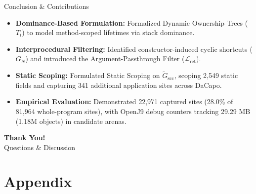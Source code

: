 \documentclass[11pt]{beamer}
\begin{document}
\begin{frame}{Conclusion \& Contributions}
  \begin{itemize}
    \item \textbf{Dominance-Based Formulation:} Formalized Dynamic Ownership Trees ($T_t$) to model method-scoped lifetimes via stack dominance.
    \item \textbf{Interprocedural Filtering:} Identified constructor-induced cyclic shortcuts ($G_N$) and introduced the Argument-Passthrough Filter ($\mathcal{L}_{\text{ret}}$).
    \item \textbf{Static Scoping:} Formulated Static Scoping on $\widetilde{G}_{\text{scc}}$, scoping 2,549 static fields and capturing 341 additional application sites across DaCapo.
    \item \textbf{Empirical Evaluation:} Demonstrated 22,971 captured sites (28.0\% of 81,964 whole-program sites), with OpenJ9 debug counters tracking 29.29 MB (1.18M objects) in candidate arenas.
  \end{itemize}

  \vspace{1em}
  \centering
  \Large \textbf{Thank You!} \\
  \vspace{0.5em}
  \small Questions \& Discussion
\end{frame}

\appendix
\section[Appendix]{Appendix}
\end{document}
